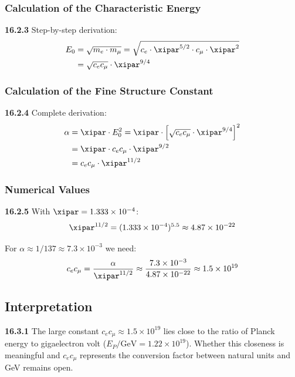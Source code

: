 \subsubsection{Calculation of the Characteristic Energy}
\noindent \textbf{16.2.3} Step-by-step derivation:
\begin{align}
	E_0 &= \sqrt{m_e \cdot m_\mu} = \sqrt{c_e \cdot \xipar^{5/2} \cdot c_\mu \cdot \xipar^2} \\
	&= \sqrt{c_e c_\mu} \cdot \xipar^{9/4}
\end{align}

\subsubsection{Calculation of the Fine Structure Constant}
\noindent \textbf{16.2.4} Complete derivation:
\begin{align}
	\alpha &= \xipar \cdot E_0^2 = \xipar \cdot \left[ \sqrt{c_e c_\mu} \cdot \xipar^{9/4} \right]^2 \\
	&= \xipar \cdot c_e c_\mu \cdot \xipar^{9/2} \\
	&= c_e c_\mu \cdot \xipar^{11/2}
\end{align}

\subsubsection{Numerical Values}
\noindent \textbf{16.2.5} With $\xipar = 1.333 \times 10^{-4}$:
\begin{equation}
	\xipar^{11/2} = (1.333 \times 10^{-4})^{5.5} \approx 4.87 \times 10^{-22}
\end{equation}

For $\alpha \approx 1/137 \approx 7.3 \times 10^{-3}$ we need:
\begin{equation}
	c_e c_\mu = \frac{\alpha}{\xipar^{11/2}} \approx \frac{7.3 \times 10^{-3}}{4.87 \times 10^{-22}} \approx 1.5 \times 10^{19}
\end{equation}

\subsection{Interpretation}
\noindent \textbf{16.3.1} The large constant $c_e c_\mu \approx 1.5\times10^{19}$ lies close to the ratio of Planck energy to gigaelectron volt ($E_P/\text{GeV} = 1.22\times10^{19}$). Whether this closeness is meaningful and $c_e c_\mu$ represents the conversion factor between natural units and GeV remains open.

